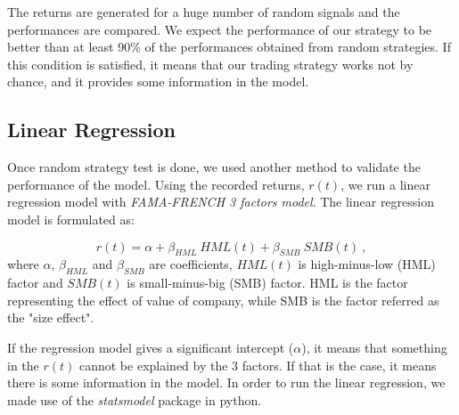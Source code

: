 The returns are generated for a huge number of random signals and the performances are compared. We expect the performance of our strategy to be better than at least 90\% of the performances obtained from random strategies. If this condition is satisfied, it means that our trading strategy works not by chance, and it provides some information in the model.


\subsection{Linear Regression}\label{ssec:linear}
Once random strategy test is done, we used another method to validate the performance of the model. Using the recorded returns, $r(t)$, we run a linear regression model with \textit{FAMA-FRENCH 3 factors model}. The linear regression model is formulated as:

\begin{equation}
r(t) = \alpha + \beta_{HML} \ HML(t) + \beta_{SMB} \ SMB(t) \ ,
\end{equation}
where $\alpha$, $\beta_{HML}$ and $\beta_{SMB}$ are coefficients, $HML(t)$ is high-minus-low (HML) factor and $SMB(t)$ is small-minus-big (SMB) factor. HML is the factor representing the effect of value of company, while SMB is the factor referred as the "size effect". \par

If the regression model gives a significant intercept ($\alpha$), it means that something in the $r(t)$ cannot be explained by the 3 factors. If that is the case, it means there is some information in the model. In order to run the linear regression, we made use of the \textit{statsmodel} package in python.
